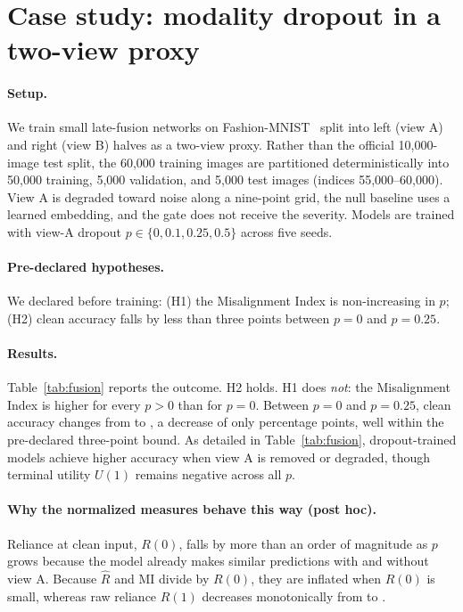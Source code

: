 \section{Case study: modality dropout in a two-view proxy}
\label{sec:fusion}

\paragraph{Setup.}
We train small late-fusion networks on Fashion-MNIST~\cite{xiao2017fashion} split
into left (view A) and right (view B) halves as a two-view proxy. Rather than the
official 10,000-image test split, the 60,000 training images are partitioned
deterministically into 50,000 training, 5,000 validation, and 5,000 test images
(indices 55,000--60,000). View A is degraded toward noise along a nine-point grid,
the null baseline uses a learned embedding, and the gate does not receive the
severity. Models are trained with view-A dropout $p\in\{0,0.1,0.25,0.5\}$ across
five seeds.

\paragraph{Pre-declared hypotheses.}
We declared before training: (H1) the Misalignment Index is non-increasing
in $p$; (H2) clean accuracy falls by less than three points between $p=0$
and $p=0.25$.

\paragraph{Results.}
Table~\ref{tab:fusion} reports the outcome. H2 holds. H1 does \emph{not}:
the Misalignment Index is higher for every $p>0$ than for $p=0$. Between
$p=0$ and $p=0.25$, clean accuracy changes from
 to
, a decrease of only
 percentage points,
well within the pre-declared three-point bound.
As detailed in Table~\ref{tab:fusion}, dropout-trained models achieve higher
accuracy when view A is removed or degraded, though terminal utility $U(1)$
remains negative across all $p$.

\paragraph{Why the normalized measures behave this way (post hoc).}
Reliance at clean input, $R(0)$, falls by more than an order of magnitude as $p$ grows because the model already makes similar predictions with and without view A. Because $\hat{R}$ and MI divide by $R(0)$, they are inflated when $R(0)$ is small, whereas raw reliance $R(1)$ decreases monotonically from  to .
